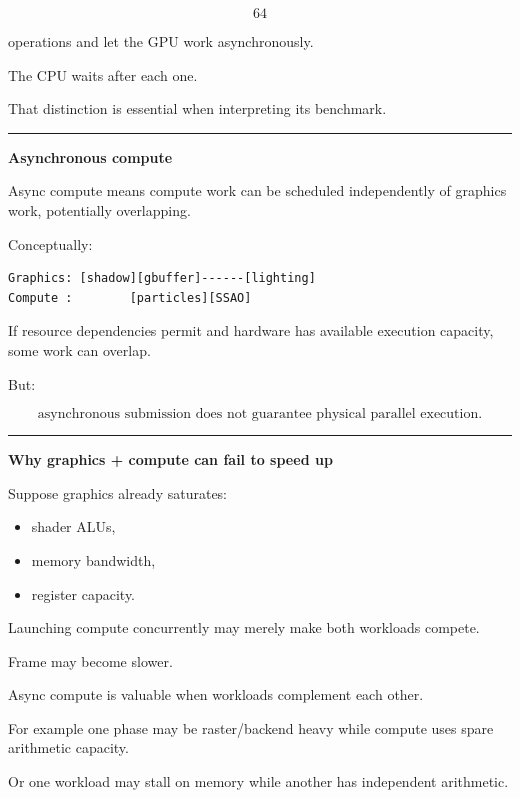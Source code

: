 \[
64
\]

operations and let the GPU work asynchronously.

The CPU waits after each one.

That distinction is essential when interpreting its benchmark.

\begin{center}\rule{0.5\linewidth}{0.5pt}\end{center}

\textbf{Asynchronous compute}

Async compute means compute work can be scheduled independently of graphics work, potentially overlapping.

Conceptually:

\protect{}\label{p10-async}%
\begin{verbatim}
Graphics: [shadow][gbuffer]------[lighting]
Compute :        [particles][SSAO]
\end{verbatim}

If resource dependencies permit and hardware has available execution capacity, some work can overlap.

But:

\[
\boxed{
\text{asynchronous submission does not guarantee physical parallel execution}.
}
\]

\begin{center}\rule{0.5\linewidth}{0.5pt}\end{center}

\textbf{Why graphics + compute can fail to speed up}

Suppose graphics already saturates:

\begin{itemize}
\tightlist
\item
  shader ALUs,
\item
  memory bandwidth,
\item
  register capacity.
\end{itemize}

Launching compute concurrently may merely make both workloads compete.

Frame may become slower.

Async compute is valuable when workloads complement each other.

For example one phase may be raster/backend heavy while compute uses spare arithmetic capacity.

Or one workload may stall on memory while another has independent arithmetic.

